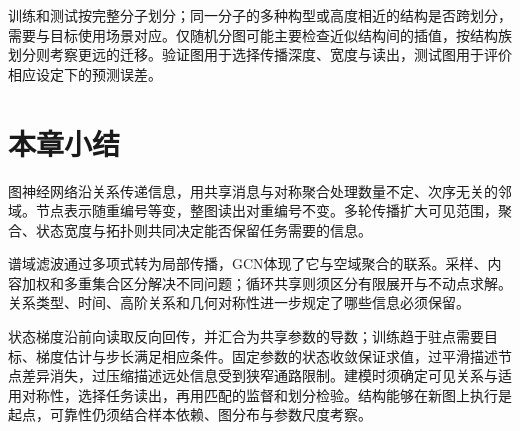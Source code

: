 训练和测试按完整分子划分；同一分子的多种构型或高度相近的结构是否跨划分，需要与目标使用场景对应。仅随机分图可能主要检查近似结构间的插值，按结构族划分则考察更远的迁移。验证图用于选择传播深度、宽度与读出，测试图用于评价相应设定下的预测误差。

\section{本章小结}
\label{sec:gnn-summary}

图神经网络沿关系传递信息，用共享消息与对称聚合处理数量不定、次序无关的邻域。节点表示随重编号等变，整图读出对重编号不变。多轮传播扩大可见范围，聚合、状态宽度与拓扑则共同决定能否保留任务需要的信息。

谱域滤波通过多项式转为局部传播，GCN体现了它与空域聚合的联系。采样、内容加权和多重集合区分解决不同问题；循环共享则须区分有限展开与不动点求解。关系类型、时间、高阶关系和几何对称性进一步规定了哪些信息必须保留。

状态梯度沿前向读取反向回传，并汇合为共享参数的导数；训练趋于驻点需要目标、梯度估计与步长满足相应条件。固定参数的状态收敛保证求值，过平滑描述节点差异消失，过压缩描述远处信息受到狭窄通路限制。建模时须确定可见关系与适用对称性，选择任务读出，再用匹配的监督和划分检验。结构能够在新图上执行是起点，可靠性仍须结合样本依赖、图分布与参数尺度考察。
